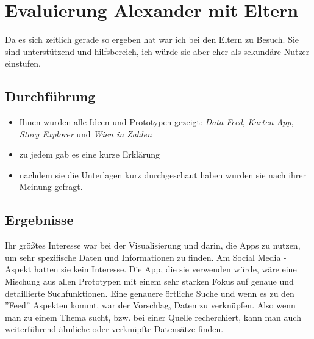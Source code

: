 \section{Evaluierung Alexander mit Eltern}
%
Da es sich zeitlich gerade so ergeben hat war ich bei den Eltern zu Besuch. Sie sind unterstützend und hilfsbereich, ich würde sie aber eher als sekundäre Nutzer einstufen.
%
\subsection{Durchführung}
%
\begin{itemize}
    \item Ihnen wurden alle Ideen und Prototypen gezeigt: \textit{Data Feed}, \textit{Karten-App}, \textit{Story Explorer} und \textit{Wien in Zahlen}
    \item zu jedem gab es eine kurze Erklärung
    \item nachdem sie die Unterlagen kurz durchgeschaut haben wurden sie nach ihrer Meinung gefragt.
\end{itemize}
%
\subsection{Ergebnisse}
%
Ihr größtes Interesse war bei der Visualisierung und darin, die Apps zu nutzen, um sehr spezifische Daten und Informationen zu finden. Am Social Media - Aspekt hatten sie kein Interesse. Die App, die sie verwenden würde, wäre eine Mischung aus allen Prototypen mit einem sehr starken Fokus auf genaue und detaillierte Suchfunktionen. Eine genauere örtliche Suche und wenn es zu den ''Feed'' Aspekten kommt, war der Vorschlag, Daten zu verknüpfen. Also wenn man zu einem Thema sucht, bzw. bei einer Quelle recherchiert, kann man auch weiterführend ähnliche oder verknüpfte Datensätze finden.